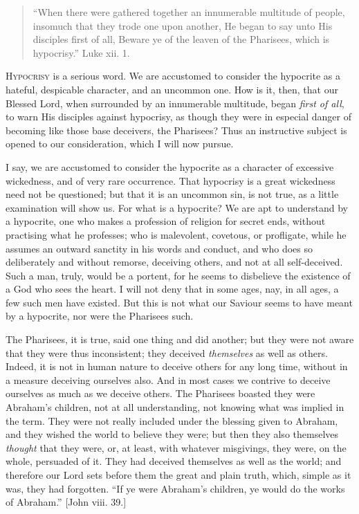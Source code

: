 
\begin{quote}

``When there were gathered together an
innumerable multitude of people, insomuch that they
trode one upon another, He began to say unto His
disciples first of all, Beware ye of the leaven of
the Pharisees, which is hypocrisy.'' Luke xii. 1.

\end{quote}

H\textsc{ypocrisy} is a serious word. We are accustomed to
consider the hypocrite as a hateful, despicable
character, and an uncommon one. How is it, then, that our
Blessed Lord, when surrounded by an innumerable
multitude, began \emph{first of all}, to warn His
disciples against hypocrisy, as though they were in
especial danger of becoming like those base deceivers,
the Pharisees? Thus an instructive subject is opened to
our consideration, which I will now pursue.

I say, we are accustomed to consider the hypocrite as
a character of excessive wickedness, and of very rare
occurrence. That hypocrisy is a great wickedness need not
be questioned; but that it is an uncommon sin, is not
true, as a little examination will show us. For what is a
hypocrite? We are apt to understand by a hypocrite, one
who makes a profession of religion for secret ends,
without practising what he professes; who is malevolent,
covetous, or profligate, while he assumes an outward
sanctity in his words and conduct, and who does so
deliberately and without remorse, deceiving others, and
not at all self-deceived. Such a man, truly, would be a
portent, for he seems to disbelieve the existence of a
God who sees the heart. I will not deny that in some
ages, nay, in all ages, a few such men have existed. But
this is not what our Saviour seems to have meant by a
hypocrite, nor were the Pharisees such.

The Pharisees, it is true, said one thing and did
another; but they were not aware that they were thus
inconsistent; they deceived \emph{themselves} as well as
others. Indeed, it is not in human nature to deceive
others for any long time, without in a measure deceiving
ourselves also. And in most cases we contrive to deceive
ourselves as much as we deceive others. The Pharisees
boasted they were Abraham's children, not at all
understanding, not knowing what was implied in the term.
They were not really included under the blessing given to
Abraham, and they wished the world to believe they were;
but then they also themselves \emph{thought} that they
were, or, at least, with whatever misgivings, they were,
on the whole, persuaded of it. They had deceived
themselves as well as the world; and therefore our Lord
sets before them the great and plain truth, which, simple
as it was, they had forgotten. ``If ye were Abraham's
children, ye would do the works of Abraham.'' [John
viii. 39.]

